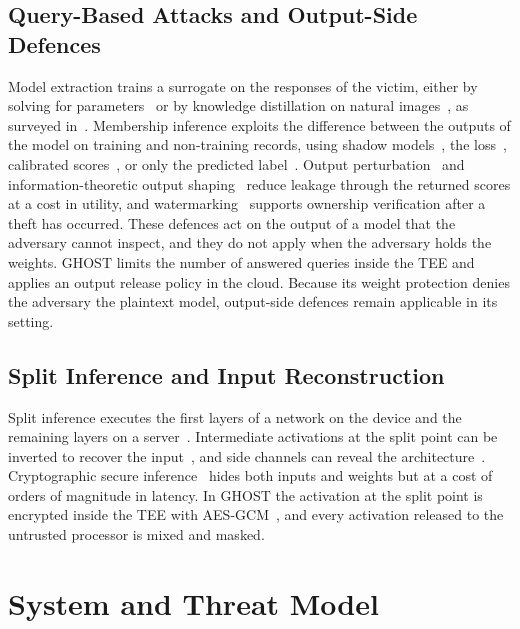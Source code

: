\documentclass[lettersize,journal]{IEEEtran}
\begin{document}
\subsection{Query-Based Attacks and Output-Side Defences}
Model extraction trains a surrogate on the responses of the victim, either by solving for parameters~\cite{tramer2016stealing} or by knowledge distillation on natural images~\cite{orekondy2019knockoff}, as surveyed in~\cite{oliynyk2023survey}. Membership inference exploits the difference between the outputs of the model on training and non-training records, using shadow models~\cite{shokri2017membership}, the loss~\cite{yeom2018privacy}, calibrated scores~\cite{song2021systematic,carlini2022lira}, or only the predicted label~\cite{choquettechoo2021label}. Output perturbation~\cite{song2019memguard} and information-theoretic output shaping~\cite{tang2024modelguard} reduce leakage through the returned scores at a cost in utility, and watermarking~\cite{pang2025modelshield} supports ownership verification after a theft has occurred. These defences act on the output of a model that the adversary cannot inspect, and they do not apply when the adversary holds the weights. GHOST limits the number of answered queries inside the TEE and applies an output release policy in the cloud. Because its weight protection denies the adversary the plaintext model, output-side defences remain applicable in its setting.

\subsection{Split Inference and Input Reconstruction}
Split inference executes the first layers of a network on the device and the remaining layers on a server~\cite{thapa2022splitfed}. Intermediate activations at the split point can be inverted to recover the input~\cite{he2019inversion}, and side channels can reveal the architecture~\cite{batina2018csi,yan2020cachetelepathy,horvath2024sok}. Cryptographic secure inference~\cite{gilad2016cryptonets,rathee2020cryptflow2} hides both inputs and weights but at a cost of orders of magnitude in latency. In GHOST the activation at the split point is encrypted inside the TEE with AES-GCM~\cite{dworkin2007gcm}, and every activation released to the untrusted processor is mixed and masked.

\section{System and Threat Model}
\label{sec:threat}
\end{document}
